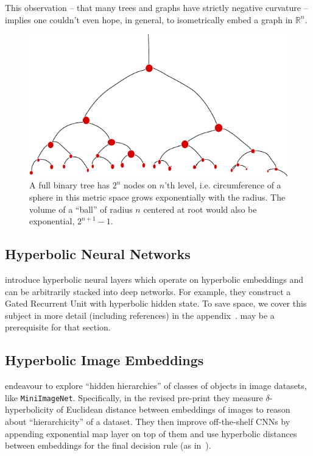 This observation -- that many trees and graphs have strictly negative curvature --
implies one couldn't even hope, in general, to isometrically embed a graph in \(
\mathbb{R}^n \).

\begin{figure}[ht]\center
    \includegraphics[width=.9\textwidth]{art/binary-tree-circumference-min.pdf}
    \caption{A full binary tree has \( 2^n \) nodes on \( n \)'th level, i.e.
    circumference of a sphere in this metric space grows exponentially with the
    radius. The volume of a ``ball'' of radius \( n \) centered at root would
    also be exponential, \( 2^{n+1} - 1 \).}
    \label{fig:binaryTreeCircumference}
\end{figure}

\subsection*{Hyperbolic Neural Networks}

\citet{ganeaHNNs} introduce hyperbolic neural layers which operate on
hyperbolic embeddings and can be arbitrarily stacked into deep networks.
For example, they construct a Gated Recurrent Unit with hyperbolic hidden
state.
To save space, we cover this subject in more detail (including references) in
the appendix~.  may be a
prerequisite for that section.

\subsection*{Hyperbolic Image Embeddings}

\citet{khrulkov} endeavour to explore ``hidden hierarchies'' of classes of
objects in image datasets, like \texttt{MiniImageNet}. Specifically, in the
revised pre-print they measure \( \delta \)-hyperbolicity of Euclidean distance
between embeddings of images to reason about ``hierarchicity'' of a dataset.
They then improve off-the-shelf CNNs by appending exponential map layer on top
of them and use hyperbolic distances between embeddings for the final
decision rule (as in~\citet{snell2017protonet}).

